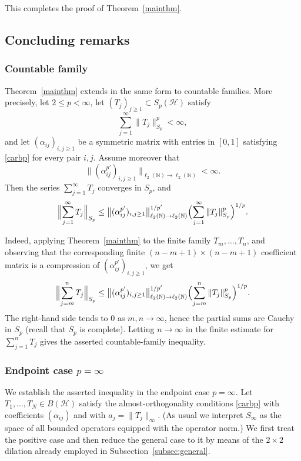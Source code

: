 \documentclass[11pt]{article}
\theoremstyle{definition}
\newcommand{\1}{\mathbf{1}}
\begin{document}
This completes the proof of Theorem~\ref{mainthm}.
\subsection{Concluding remarks}
\subsubsection{Countable family}\label{count1}
Theorem~\ref{mainthm} extends in the same form to countable families. More
precisely, let \(2\le p<\infty\), let \((T_j)_{j\ge1}\subset S_p(\mathcal H)\)
satisfy
\[
\sum_{j=1}^{\infty}\|T_j\|_{S_p}^p<\infty,
\]
and let \((\alpha_{ij})_{i,j\ge1}\) be a symmetric matrix with entries in
\([0,1]\) satisfying \eqref{carbp} for every pair \(i,j\). Assume moreover that
\[
\bigl\|(\alpha_{ij}^{p'})_{i,j\ge1}\bigr\|_{\ell_2(\mathbb N)\to
\ell_2(\mathbb N)}<\infty.
\]
Then the series \(\sum_{j=1}^{\infty}T_j\) converges in \(S_p\), and
\[
\Bigl\|\sum_{j=1}^{\infty}T_j\Bigr\|_{S_p}
\le
 \bigl\|(\alpha_{ij}^{p'})_{i,j\ge1}\bigr\|_{\ell_2(\mathbb N)\to
\ell_2(\mathbb N)}^{1/p'}
\Bigl(\sum_{j=1}^{\infty}\|T_j\|_{S_p}^p\Bigr)^{1/p}.
\]

Indeed, applying Theorem~\ref{mainthm} to the finite family
\(T_m,\dots,T_n\), and observing that the corresponding finite $(n-m+1)\times (n-m+1)$ coefficient
matrix is a compression of \((\alpha_{ij}^{p'})_{i,j\ge1}\), we get
\[
\Bigl\|\sum_{j=m}^{n}T_j\Bigr\|_{S_p}
\le
\bigl\|(\alpha_{ij}^{p'})_{i,j\ge1}\bigr\|_{\ell_2(\mathbb N)\to
\ell_2(\mathbb N)}^{1/p'}
\Bigl(\sum_{j=m}^{n}\|T_j\|_{S_p}^p\Bigr)^{1/p}.
\]
The right-hand side tends to \(0\) as \(m,n\to\infty\), hence the partial sums
are Cauchy in \(S_p\) (recall that $S_{p}$ is complete). Letting \(n\to\infty\) in the finite estimate for
\(\sum_{j=1}^{n}T_j\) gives the asserted countable-family inequality.

\subsubsection{Endpoint case \texorpdfstring{$p=\infty$}{p=infinity}}\label{Grok11}
We establish the asserted inequality in the endpoint case \(p=\infty\). Let \(T_1,\dots,T_N\in B(\mathcal{H})\) satisfy the almost-orthogonality conditions \eqref{carbp} with coefficients \((\alpha_{ij})\) and with \(a_j=\|T_j\|_\infty\). (As usual we interpret \(S_\infty\) as the space of all bounded operators equipped with the operator norm.) We first treat the positive case and then reduce the general case to it by means of the \(2\times 2\) dilation already employed in Subsection~\ref{subsec:general}.
\end{document}
